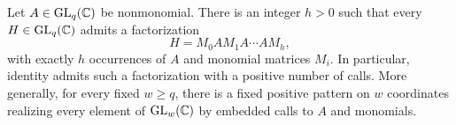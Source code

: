 \begin{samepage}
\begin{lemma}\label{lem:generation}
Let $A\in\operatorname{GL}_q(\mathbb C)$ be nonmonomial.  There is an integer $h>0$ such that
every $H\in\operatorname{GL}_q(\mathbb C)$ admits a factorization
\begin{equation}\label{gen:eq:common-pattern}
H=M_0 A M_1 A\cdots A M_h,
\end{equation}
with exactly $h$ occurrences of $A$ and monomial matrices $M_i$.
In particular, identity admits such a factorization with a positive
number of calls.  More generally, for every fixed $w\geq q$, there is
a fixed positive pattern on $w$ coordinates realizing every element
of $\operatorname{GL}_w(\mathbb C)$ by embedded calls to $A$ and monomials.
\end{lemma}
\end{samepage}

